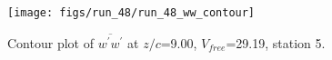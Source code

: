 \begin{figure}[H]
\centering
\texttt{[image: figs/run\_48/run\_48\_ww\_contour]}
\caption{Contour plot of $\overline{w^\prime w^\prime}$ at $z/c$=9.00, $V_{free}$=29.19, station 5.}
\end{figure}


